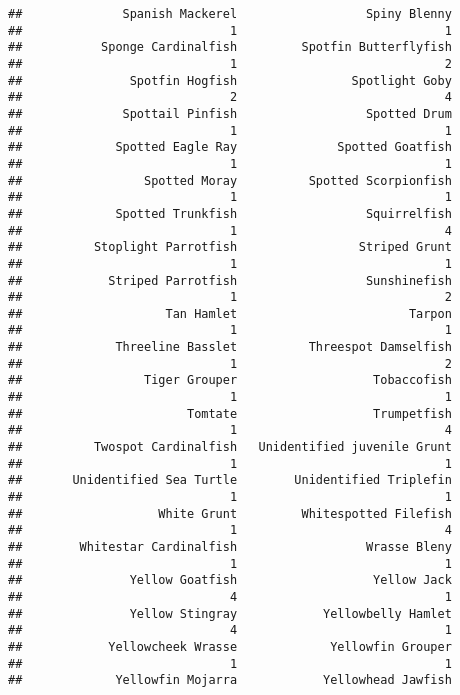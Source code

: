 \documentclass[
]{article}
\begin{document}
\begin{verbatim}
##              Spanish Mackerel                  Spiny Blenny 
##                             1                             1 
##           Sponge Cardinalfish         Spotfin Butterflyfish 
##                             1                             2 
##               Spotfin Hogfish                Spotlight Goby 
##                             2                             4 
##              Spottail Pinfish                  Spotted Drum 
##                             1                             1 
##             Spotted Eagle Ray              Spotted Goatfish 
##                             1                             1 
##                 Spotted Moray          Spotted Scorpionfish 
##                             1                             1 
##             Spotted Trunkfish                  Squirrelfish 
##                             1                             4 
##          Stoplight Parrotfish                 Striped Grunt 
##                             1                             1 
##            Striped Parrotfish                  Sunshinefish 
##                             1                             2 
##                    Tan Hamlet                        Tarpon 
##                             1                             1 
##             Threeline Basslet          Threespot Damselfish 
##                             1                             2 
##                 Tiger Grouper                   Tobaccofish 
##                             1                             1 
##                       Tomtate                   Trumpetfish 
##                             1                             4 
##          Twospot Cardinalfish   Unidentified juvenile Grunt 
##                             1                             1 
##       Unidentified Sea Turtle        Unidentified Triplefin 
##                             1                             1 
##                   White Grunt         Whitespotted Filefish 
##                             1                             4 
##        Whitestar Cardinalfish                  Wrasse Bleny 
##                             1                             1 
##               Yellow Goatfish                   Yellow Jack 
##                             4                             1 
##               Yellow Stingray            Yellowbelly Hamlet 
##                             4                             1 
##            Yellowcheek Wrasse             Yellowfin Grouper 
##                             1                             1 
##             Yellowfin Mojarra            Yellowhead Jawfish 

\end{verbatim}
\end{document}
